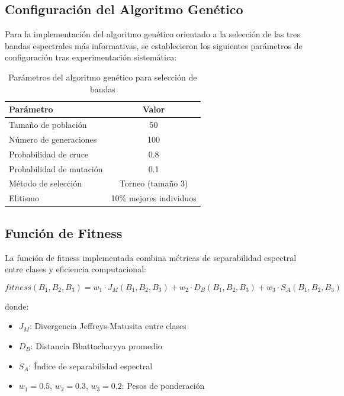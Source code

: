 \subsection{Configuración del Algoritmo Genético}

Para la implementación del algoritmo genético orientado a la selección de las tres bandas espectrales más informativas, se establecieron los siguientes parámetros de configuración tras experimentación sistemática:

\begin{table}[h!]
\centering
\caption{Parámetros del algoritmo genético para selección de bandas}
\begin{tabular}{|l|c|}
\hline
\textbf{Parámetro} & \textbf{Valor} \\
\hline
Tamaño de población & 50 \\
\hline
Número de generaciones & 100 \\
\hline
Probabilidad de cruce & 0.8 \\
\hline
Probabilidad de mutación & 0.1 \\
\hline
Método de selección & Torneo (tamaño 3) \\
\hline
Elitismo & 10\% mejores individuos \\
\hline
\end{tabular}
\label{tab:genetic_parameters}
\end{table}

\subsection{Función de Fitness}

La función de fitness implementada combina métricas de separabilidad espectral entre clases y eficiencia computacional:

\begin{equation}
fitness(B_1, B_2, B_3) = w_1 \cdot J_M(B_1, B_2, B_3) + w_2 \cdot D_B(B_1, B_2, B_3) + w_3 \cdot S_A(B_1, B_2, B_3)
\end{equation}

donde:
\begin{itemize}
    \item $J_M$: Divergencia Jeffreys-Matusita entre clases
    \item $D_B$: Distancia Bhattacharyya promedio
    \item $S_A$: Índice de separabilidad espectral
    \item $w_1 = 0.5$, $w_2 = 0.3$, $w_3 = 0.2$: Pesos de ponderación
\end{itemize}

